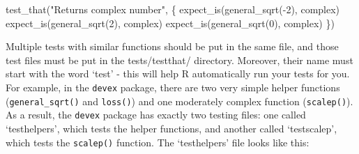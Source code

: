 \documentclass[
]{book}
\newenvironment{Shaded}{\begin{snugshade}}{\end{snugshade}}
\newcommand{\DecValTok}[1]{\textcolor[rgb]{0.00,0.00,0.81}{#1}}
\newcommand{\FunctionTok}[1]{\textcolor[rgb]{0.00,0.00,0.00}{#1}}
\newcommand{\NormalTok}[1]{#1}
\newcommand{\SpecialCharTok}[1]{\textcolor[rgb]{0.00,0.00,0.00}{#1}}
\newcommand{\StringTok}[1]{\textcolor[rgb]{0.31,0.60,0.02}{#1}}
\begin{document}
\begin{Shaded}
\begin{Highlighting}[]
\FunctionTok{test\_that}\NormalTok{(}\StringTok{"Returns complex number"}\NormalTok{, \{}
  \FunctionTok{expect\_is}\NormalTok{(}\FunctionTok{general\_sqrt}\NormalTok{(}\SpecialCharTok{{-}}\DecValTok{2}\NormalTok{), }\StringTok{\textquotesingle{}complex\textquotesingle{}}\NormalTok{)}
  \FunctionTok{expect\_is}\NormalTok{(}\FunctionTok{general\_sqrt}\NormalTok{(}\DecValTok{2}\NormalTok{), }\StringTok{\textquotesingle{}complex\textquotesingle{}}\NormalTok{)}
  \FunctionTok{expect\_is}\NormalTok{(}\FunctionTok{general\_sqrt}\NormalTok{(}\DecValTok{0}\NormalTok{), }\StringTok{\textquotesingle{}complex\textquotesingle{}}\NormalTok{)}
\NormalTok{\})}
\end{Highlighting}
\end{Shaded}

Multiple tests with similar functions should be put in the same file, and those test files must be put in the tests/testthat/ directory. Moreover, their name must start with the word `test' - this will help R automatically run your tests for you. For example, in the \texttt{devex} package, there are two very simple helper functions (\texttt{general\_sqrt()} and \texttt{loss()}) and one moderately complex function (\texttt{scalep()}). As a result, the \texttt{devex} package has exactly two testing files: one called `testhelpers', which tests the helper functions, and another called `testscalep', which tests the \texttt{scalep()} function. The `testhelpers' file looks like this:
\end{document}
